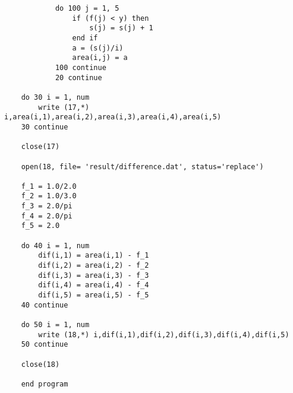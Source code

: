\documentclass[12pt,a4paper]{jsarticle}
\begin{document}
\begin{lstlisting}
            do 100 j = 1, 5   
                if (f(j) < y) then
                    s(j) = s(j) + 1
                end if    
                a = (s(j)/i)
                area(i,j) = a
            100 continue
            20 continue
    
    do 30 i = 1, num
        write (17,*) i,area(i,1),area(i,2),area(i,3),area(i,4),area(i,5)
    30 continue
    
    close(17)
    
    open(18, file= 'result/difference.dat', status='replace')
    
    f_1 = 1.0/2.0
    f_2 = 1.0/3.0
    f_3 = 2.0/pi
    f_4 = 2.0/pi
    f_5 = 2.0
    
    do 40 i = 1, num
        dif(i,1) = area(i,1) - f_1
        dif(i,2) = area(i,2) - f_2
        dif(i,3) = area(i,3) - f_3
        dif(i,4) = area(i,4) - f_4
        dif(i,5) = area(i,5) - f_5
    40 continue
    
    do 50 i = 1, num
        write (18,*) i,dif(i,1),dif(i,2),dif(i,3),dif(i,4),dif(i,5)
    50 continue
    
    close(18)
    
    end program
\end{lstlisting}
\end{document}
